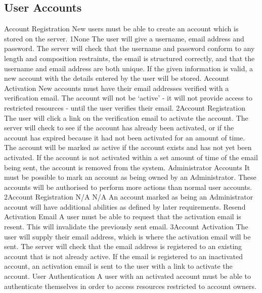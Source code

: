 	\subsection{User Accounts}
		\funcreq
			{Account Registration}
			{New users must be able to create an account which is stored on 
			the server.}
			{1}{None}
			{The user will give a username, email address and password.}
			{The server will check that the username and password conform 
			to any length and composition restraints, the email is structured 
			correctly, and that the username and email address are both unique.
			}
			{If the given information is valid, a new account with the details 
			entered by the user will be stored.}
		\funcreq
			{Account Activation}
			{New accounts must have their email addresses verified with a 
			verification email. The account will not be `active' - it will not 
			provide access to restricted resources - until the user verifies 
			their email.}
			{2}{Account Registration}
			{The user will click a link on the verification email to activate 
			the account.}
			{The server will check to see if the account has already been 
			activated, or if the account has expired because it had not been 
			activated for an amount of time.}
			{The account will be marked as active if the account exists and 
			has not yet been activated. If the account is not activated 
			within a set amount of time of the email being sent, the account 
			is removed from the system.}
		\funcreq
			{Administrator Accounts}
			{It must be possible to mark an account as being owned by an 
			Administrator. These accounts will be authorised to perform more 
			actions than normal user accounts.}
			{2}{Account Registration}
			{N/A}
			{N/A}
			{An account marked as being an Administrator account will have 
			additional abilities as defined by later requirements.}
		\funcreq
			{Resend Activation Email}
			{A user must be able to request that the activation email is
			resent. This will invalidate the previously sent email.}
			{3}{Account Activation}
			{The user will supply their email address, which is where the 
			activation email will be sent.}
			{The server will check that the email address is registered to an 
			existing account that is not already active.}
			{If the email is registered to an inactivated account, an 
			activation email is sent to the user with a link to activate the 
			account.}
		\funcreq
			{User Authentication}
			{A user with an activated account must be able to authenticate 
			themselves in order to access resources restricted to account 
			owners.}
